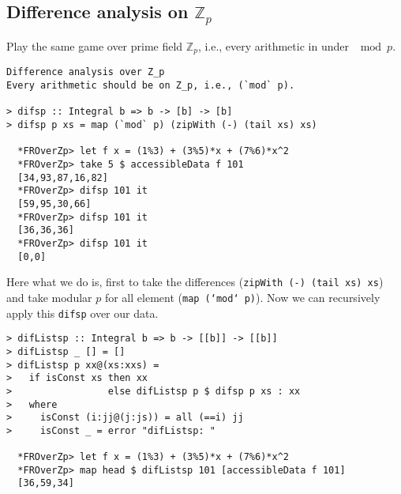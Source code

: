 \documentclass[11pt]{book}
\begin{document}
\subsection{Difference analysis on $\mathbb{Z}_p$}
Play the same game over prime field $\mathbb{Z}_p$, i.e., every arithmetic in under $\mod p$.

\begin{verbatim}
Difference analysis over Z_p
Every arithmetic should be on Z_p, i.e., (`mod` p).

> difsp :: Integral b => b -> [b] -> [b]
> difsp p xs = map (`mod` p) (zipWith (-) (tail xs) xs)

  *FROverZp> let f x = (1%3) + (3%5)*x + (7%6)*x^2
  *FROverZp> take 5 $ accessibleData f 101
  [34,93,87,16,82]
  *FROverZp> difsp 101 it
  [59,95,30,66]
  *FROverZp> difsp 101 it
  [36,36,36]
  *FROverZp> difsp 101 it
  [0,0]
\end{verbatim}
Here what we do is, first to take the differences (\texttt{zipWith (-) (tail xs) xs}) and take modular $p$ for all element (\texttt{map (`mod` p)}).
Now we can recursively apply this \texttt{difsp} over our data.
\begin{verbatim}
> difListsp :: Integral b => b -> [[b]] -> [[b]]
> difListsp _ [] = []
> difListsp p xx@(xs:xxs) =
>   if isConst xs then xx
>                 else difListsp p $ difsp p xs : xx
>   where
>     isConst (i:jj@(j:js)) = all (==i) jj
>     isConst _ = error "difListsp: "

  *FROverZp> let f x = (1%3) + (3%5)*x + (7%6)*x^2
  *FROverZp> map head $ difListsp 101 [accessibleData f 101]
  [36,59,34]
\end{verbatim}
\end{document}
